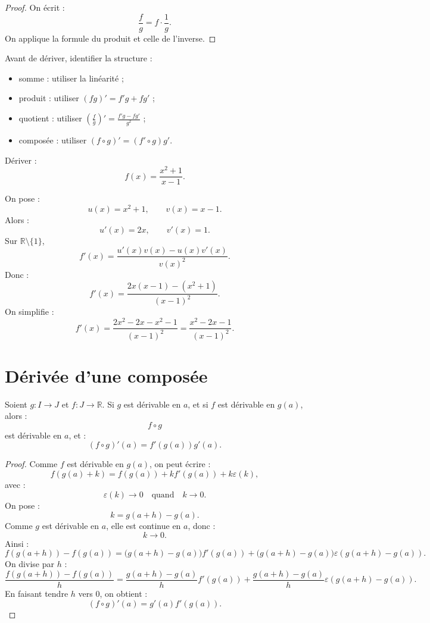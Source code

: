 \documentclass[11pt,a4paper]{article}
\newcommand{\R}{\mathbb R}
\begin{document}
\begin{proof}
On écrit :
\[
\frac fg=f\cdot\frac1g.
\]
On applique la formule du produit et celle de l'inverse.
\end{proof}

\begin{methodbox}
Avant de dériver, identifier la structure :
\begin{itemize}
    \item somme : utiliser la linéarité ;
    \item produit : utiliser \((fg)'=f'g+fg'\) ;
    \item quotient : utiliser \(\left(\frac fg\right)'=\frac{f'g-fg'}{g^2}\) ;
    \item composée : utiliser \((f\circ g)'=(f'\circ g)g'\).
\end{itemize}
\end{methodbox}

\begin{exercicebox}
Dériver :
\[
f(x)=\frac{x^2+1}{x-1}.
\]
\end{exercicebox}

\begin{correctionbox}
On pose :
\[
u(x)=x^2+1,
\qquad
v(x)=x-1.
\]
Alors :
\[
u'(x)=2x,
\qquad
v'(x)=1.
\]
Sur \(\R\setminus\{1\}\),
\[
f'(x)=\frac{u'(x)v(x)-u(x)v'(x)}{v(x)^2}.
\]
Donc :
\[
f'(x)=\frac{2x(x-1)-(x^2+1)}{(x-1)^2}.
\]
On simplifie :
\[
f'(x)=\frac{2x^2-2x-x^2-1}{(x-1)^2}
=
\frac{x^2-2x-1}{(x-1)^2}.
\]
\end{correctionbox}

\section{Dérivée d'une composée}

\begin{theorembox}
Soient \(g:I\to J\) et \(f:J\to\R\).  
Si \(g\) est dérivable en \(a\), et si \(f\) est dérivable en \(g(a)\), alors :
\[
f\circ g
\]
est dérivable en \(a\), et :
\[
(f\circ g)'(a)=f'(g(a))g'(a).
\]
\end{theorembox}

\begin{proof}
Comme \(f\) est dérivable en \(g(a)\), on peut écrire :
\[
f(g(a)+k)=f(g(a))+kf'(g(a))+k\varepsilon(k),
\]
avec :
\[
\varepsilon(k)\to0
\quad\text{quand}\quad k\to0.
\]
On pose :
\[
k=g(a+h)-g(a).
\]
Comme \(g\) est dérivable en \(a\), elle est continue en \(a\), donc :
\[
k\to0.
\]
Ainsi :
\[
f(g(a+h))-f(g(a))
=
\bigl(g(a+h)-g(a)\bigr)f'(g(a))
+
\bigl(g(a+h)-g(a)\bigr)\varepsilon(g(a+h)-g(a)).
\]
On divise par \(h\) :
\[
\frac{f(g(a+h))-f(g(a))}{h}
=
\frac{g(a+h)-g(a)}{h}f'(g(a))
+
\frac{g(a+h)-g(a)}{h}\varepsilon(g(a+h)-g(a)).
\]
En faisant tendre \(h\) vers \(0\), on obtient :
\[
(f\circ g)'(a)=g'(a)f'(g(a)).
\]
\end{proof}
\end{document}
